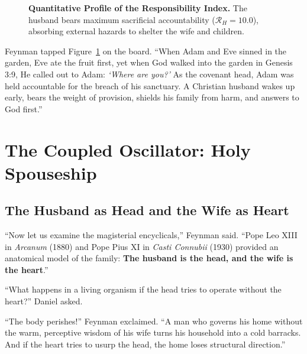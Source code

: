\documentclass[11pt]{report}
\begin{document}
\begin{figure}[H]
\caption{\textbf{Quantitative Profile of the Responsibility Index.} The husband bears maximum sacrificial accountability ($\mathcal{R}_H = 10.0$), absorbing external hazards to shelter the wife and children.}
\label{fig:textbook_bars}
\end{figure}

Feynman tapped Figure~\ref{fig:textbook_bars} on the board. ``When Adam and Eve sinned in the garden, Eve ate the fruit first, yet when God walked into the garden in Genesis 3:9, He called out to Adam: \textit{`Where are you?'} As the covenant head, Adam was held accountable for the breach of his sanctuary. A Christian husband wakes up early, bears the weight of provision, shields his family from harm, and answers to God first.''

\chapter{The Coupled Oscillator: Holy Spouseship}

\section{The Husband as Head and the Wife as Heart}
``Now let us examine the magisterial encyclicals,'' Feynman said. ``Pope Leo XIII in \textit{Arcanum} (1880) and Pope Pius XI in \textit{Casti Connubii} (1930) provided an anatomical model of the family: \textbf{The husband is the head, and the wife is the heart}.''

``What happens in a living organism if the head tries to operate without the heart?'' Daniel asked.

``The body perishes!'' Feynman exclaimed. ``A man who governs his home without the warm, perceptive wisdom of his wife turns his household into a cold barracks. And if the heart tries to usurp the head, the home loses structural direction.''
\end{document}
